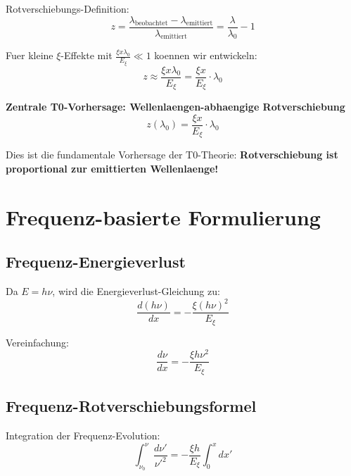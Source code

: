 \documentclass[12pt,a4paper]{article}
\newcommand{\Exi}{E_\xi}
\newcommand{\lambdazero}{\lambda_0}
\newcommand{\nuzero}{\nu_0}
\theoremstyle{definition}
\begin{document}
	\begin{formel}
		Rotverschiebungs-Definition:
		\begin{equation}
			z = \frac{\lambda_{\text{beobachtet}} - \lambda_{\text{emittiert}}}{\lambda_{\text{emittiert}}} = \frac{\lambda}{\lambdazero} - 1
		\end{equation}
	\end{formel}
	
	Fuer kleine $\xi$-Effekte mit $\frac{\xi x \lambdazero}{\Exi} \ll 1$ koennen wir entwickeln:
	\begin{equation}
		z \approx \frac{\xi x \lambdazero}{\Exi} = \frac{\xi x}{\Exi} \cdot \lambdazero
	\end{equation}
	
	\begin{wichtig}
		\textbf{Zentrale T0-Vorhersage: Wellenlaengen-abhaengige Rotverschiebung}
		\begin{equation}
			\boxed{z(\lambdazero) = \frac{\xi x}{\Exi} \cdot \lambdazero}
		\end{equation}
		
		Dies ist die fundamentale Vorhersage der T0-Theorie: \textbf{Rotverschiebung ist proportional zur emittierten Wellenlaenge!}
	\end{wichtig}
	
	\section{Frequenz-basierte Formulierung}
	
	\subsection{Frequenz-Energieverlust}
	
	Da $E = h\nu$, wird die Energieverlust-Gleichung zu:
	\begin{equation}
		\frac{d(h\nu)}{dx} = -\frac{\xi (h\nu)^2}{\Exi}
	\end{equation}
	
	Vereinfachung:
	\begin{equation}
		\frac{d\nu}{dx} = -\frac{\xi h \nu^2}{\Exi}
	\end{equation}
	
	\subsection{Frequenz-Rotverschiebungsformel}
	
	Integration der Frequenz-Evolution:
	\begin{equation}
		\int_{\nuzero}^{\nu} \frac{d\nu'}{\nu'^2} = -\frac{\xi h}{\Exi} \int_0^x dx'
	\end{equation}
	
\end{document}
